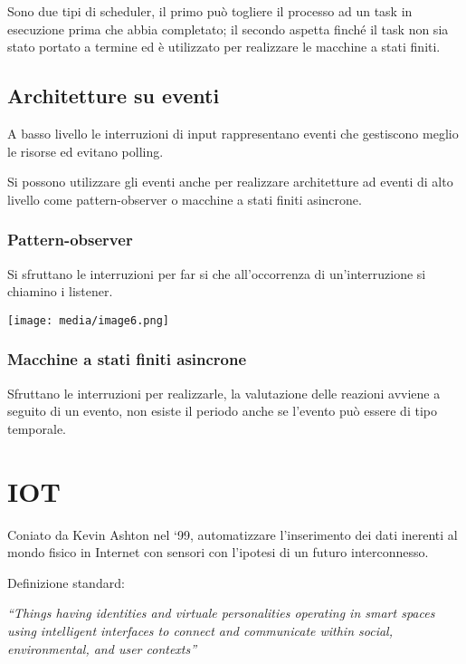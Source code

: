 Sono due tipi di scheduler, il primo può togliere il processo ad un task
in esecuzione prima che abbia completato; il secondo aspetta finché il
task non sia stato portato a termine ed è utilizzato per realizzare le
macchine a stati finiti.

\subsection{Architetture su eventi}\label{architetture-su-eventi}

A basso livello le interruzioni di input rappresentano eventi che
gestiscono meglio le risorse ed evitano polling.

Si possono utilizzare gli eventi anche per realizzare architetture ad
eventi di alto livello come pattern-observer o macchine a stati finiti
asincrone.

\subsubsection{Pattern-observer}\label{pattern-observer}

Si sfruttano le interruzioni per far si che all'occorrenza di
un'interruzione si chiamino i listener.

\texttt{[image: media/image6.png]}

\subsubsection{Macchine a stati finiti
asincrone}\label{macchine-a-stati-finiti-asincrone}

Sfruttano le interruzioni per realizzarle, la valutazione delle reazioni
avviene a seguito di un evento, non esiste il periodo anche se l'evento
può essere di tipo temporale.

\section{IOT}\label{iot}

Coniato da Kevin Ashton nel `99, automatizzare l'inserimento dei dati
inerenti al mondo fisico in Internet con sensori con l'ipotesi di un
futuro interconnesso.

Definizione standard:

\emph{``Things having identities and virtuale personalities operating in
smart spaces using intelligent interfaces to connect and communicate
within social, environmental, and user contexts''}

